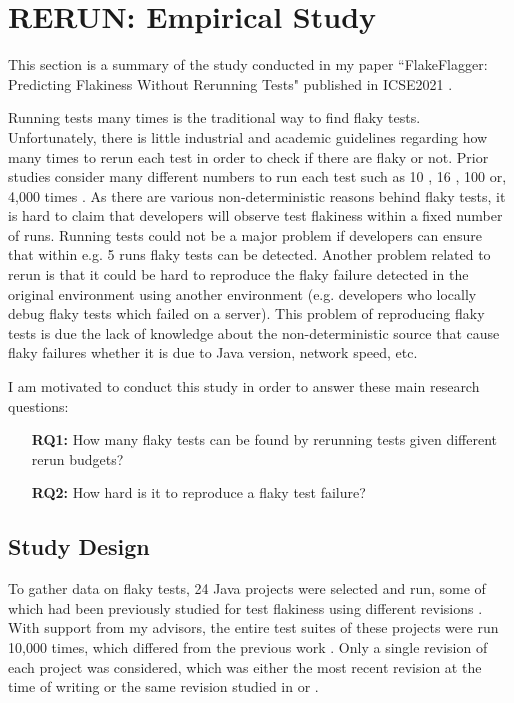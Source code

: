 \section{RERUN: Empirical Study}
\label{sec:flakeFlaggerStudy}
%
This section is a summary of the study conducted in my paper ``FlakeFlagger: Predicting Flakiness Without Rerunning Tests" published in ICSE2021 \cite{alshammari2021flakeflagger}.

Running tests many times is the traditional way to find flaky tests. Unfortunately, there is little industrial and academic guidelines regarding how many times to rerun each test in order to check if there are flaky or not. Prior studies consider many different numbers to run each test such as 10 \cite{bell2018deflaker}, 16 \cite{lam2019idflakies}, 100 \cite{lam2019root} or, 4,000 times \cite{lam2020Understanding}.
As there are various non-deterministic reasons behind flaky tests, it is hard to claim that developers will observe test flakiness within a fixed number of runs. 
Running tests could not be a major problem if developers can ensure that within e.g. 5 runs flaky tests can be detected.
Another problem related to rerun is that it could be hard to reproduce the flaky failure detected in the original environment using another environment (e.g. developers who locally debug flaky tests which failed on a server). This problem of reproducing flaky tests is due the lack of knowledge about the non-deterministic source that cause flaky failures whether it is due to Java version, network speed, etc. 

I am motivated to conduct this study in order to answer these main research questions:

\begin{itemize}
\setlength{\itemindent}{3em}
\item[\textbf{RQ1:}]
How many flaky tests can be found by rerunning tests given different rerun budgets?
\item[\textbf{RQ2:}] 
How hard is it to reproduce a flaky test failure? 

\end{itemize}


\subsection{Study Design}
To gather data on flaky tests, 24 Java projects were selected and run, some of which had been previously studied for test flakiness using different revisions \cite{bell2018deflaker} \cite{lam2019idflakies}. With support from my advisors, the entire test suites of these projects were run 10,000 times, which differed from the previous work \cite{bell2018deflaker} \cite{lam2019idflakies}. Only a single revision of each project was considered, which was either the most recent revision at the time of writing or the same revision studied in \cite{bell2018deflaker} or \cite{lam2019idflakies}.

